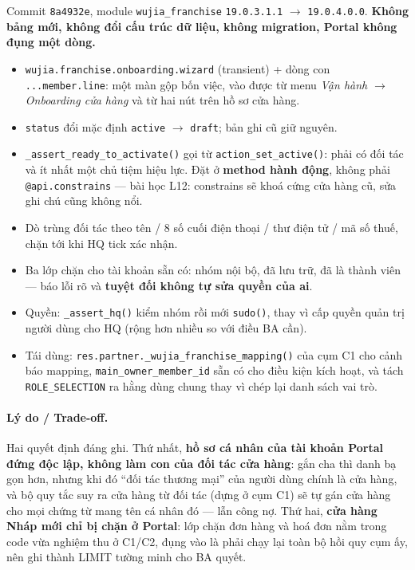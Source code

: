 Commit \texttt{8a4932e}, module \texttt{wujia\_franchise} \texttt{19.0.3.1.1} $\to$
\texttt{19.0.4.0.0}. \textbf{Không bảng mới, không đổi cấu trúc dữ liệu, không migration,
Portal không đụng một dòng.}

\begin{itemize}
\item \texttt{wujia.franchise.onboarding.wizard} (transient) + dòng con
  \texttt{...member.line}: một màn gộp bốn việc, vào được từ menu \emph{Vận hành $\to$
  Onboarding cửa hàng} và từ hai nút trên hồ sơ cửa hàng.
\item \texttt{status} đổi mặc định \texttt{active} $\to$ \texttt{draft}; bản ghi cũ giữ
  nguyên.
\item \texttt{\_assert\_ready\_to\_activate()} gọi từ \texttt{action\_set\_active()}: phải có
  đối tác và ít nhất một chủ tiệm hiệu lực. Đặt ở \textbf{method hành động}, không phải
  \texttt{@api.constrains} --- bài học L12: constrains sẽ khoá cứng cửa hàng cũ, sửa ghi chú
  cũng không nổi.
\item Dò trùng đối tác theo tên / 8 số cuối điện thoại / thư điện tử / mã số thuế, chặn tới
  khi HQ tick xác nhận.
\item Ba lớp chặn cho tài khoản sẵn có: nhóm nội bộ, đã lưu trữ, đã là thành viên --- báo lỗi
  rõ và \textbf{tuyệt đối không tự sửa quyền của ai}.
\item Quyền: \texttt{\_assert\_hq()} kiểm nhóm rồi mới \texttt{sudo()}, thay vì cấp quyền
  quản trị người dùng cho HQ (rộng hơn nhiều so với điều BA cần).
\item Tái dùng: \texttt{res.partner.\_wujia\_franchise\_mapping()} của cụm C1 cho cảnh báo
  mapping, \texttt{main\_owner\_member\_id} sẵn có cho điều kiện kích hoạt, và tách
  \texttt{ROLE\_SELECTION} ra hằng dùng chung thay vì chép lại danh sách vai trò.
\end{itemize}

\paragraph{Lý do / Trade-off.} Hai quyết định đáng ghi. Thứ nhất, \textbf{hồ sơ cá nhân của
tài khoản Portal đứng độc lập, không làm con của đối tác cửa hàng}: gắn cha thì danh bạ gọn
hơn, nhưng khi đó ``đối tác thương mại'' của người dùng chính là cửa hàng, và bộ quy tắc suy
ra cửa hàng từ đối tác (dựng ở cụm C1) sẽ tự gán cửa hàng cho mọi chứng từ mang tên cá nhân
đó --- lẫn công nợ. Thứ hai, \textbf{cửa hàng Nháp mới chỉ bị chặn ở Portal}: lớp chặn đơn
hàng và hoá đơn nằm trong code vừa nghiệm thu ở C1/C2, đụng vào là phải chạy lại toàn bộ hồi
quy cụm ấy, nên ghi thành LIMIT tường minh cho BA quyết.

